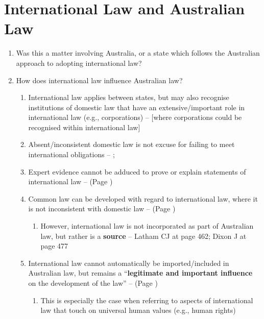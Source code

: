 \section{International Law and Australian Law}
\begin{enumerate}
    \item Was this a matter involving Australia, or a state which follows the Australian approach to adopting international law?
    \item How does international law influence Australian law?
    \begin{enumerate}
        \item International law applies between states, but may also recognise institutions of domestic law that have an extensive/important role in international law (e.g., corporations) --  [where corporations could be recognised within international law]
        \item Absent/inconsistent domestic law is not excuse for failing to meet international obligations -- ; 
        \item Expert evidence cannot be adduced to prove or explain statements of international law --  (Page \pageref{case:ACCC v Garuda})
        \item Common law can be developed with regard to international law, where it is not inconsistent with domestic law --  (Page \pageref{case:Chow Hung Ching})
        \begin{enumerate}
            \item However, international law is not incorporated as part of Australian law, but rather is a \textbf{source} -- Latham CJ at page 462; Dixon J at page 477
        \end{enumerate}
        \item International law cannot automatically be imported/included in Australian law, but remains a ``\textbf{legitimate and important influence} on the development of the law'' --  (Page \pageref{case: Mabo})
        \begin{enumerate}
            \item This is especially the case when referring to aspects of international law that touch on universal human values (e.g., human rights)

\end{enumerate}
\end{enumerate}
\end{enumerate}
